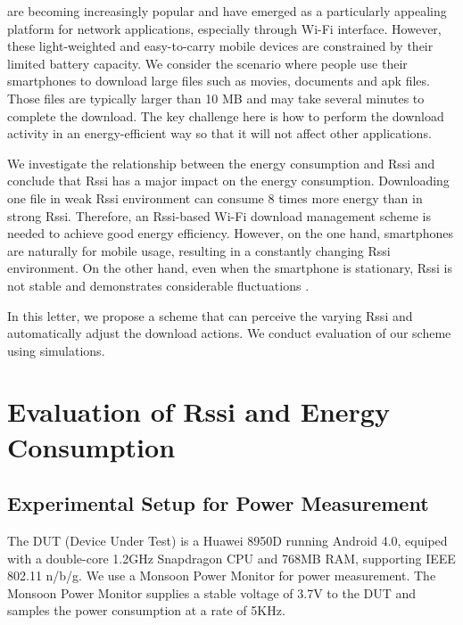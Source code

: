\documentclass[journal]{IEEEtran}
\begin{document}
 are becoming increasingly popular and have emerged as a particularly appealing platform for network applications, 
especially through Wi-Fi interface.
However, these light-weighted and easy-to-carry mobile devices are constrained by their limited battery capacity.
We consider the scenario where people use their smartphones to download large files such as movies, documents and apk files.
Those files are typically 
larger than 10 MB and may take several minutes to complete the download.
The key challenge here is how to perform the download activity in an energy-efficient way so that 
it will not affect other applications. 

We investigate the relationship between the energy consumption and Rssi and conclude that Rssi has a major 
impact on the energy consumption. Downloading one file
in weak Rssi environment can consume 8 times more energy than in strong Rssi. Therefore, 
an Rssi-based Wi-Fi download management scheme is needed to achieve good energy efficiency.
However, on the one hand,
smartphones are naturally for mobile usage, resulting in a constantly changing Rssi environment.
On the other hand, even when the smartphone is stationary, Rssi is not stable and
demonstrates considerable fluctuations \cite{biblio1}\cite{biblio2}.

In this letter, we propose a scheme that can perceive the varying Rssi and automatically 
adjust the download actions. We conduct evaluation of our scheme using simulations.

\section{Evaluation of Rssi and Energy Consumption}
\subsection{Experimental Setup for Power Measurement}
The DUT (Device Under Test) 
is a Huawei 8950D running Android 4.0, equiped with a double-core 1.2GHz Snapdragon CPU and 768MB RAM, supporting IEEE 802.11 n/b/g.
We use a Monsoon Power Monitor \cite{biblio5} for power measurement.
The Monsoon Power Monitor supplies a stable voltage of 3.7V to the DUT and samples the power consumption at a rate of 5KHz. 
\end{document}
